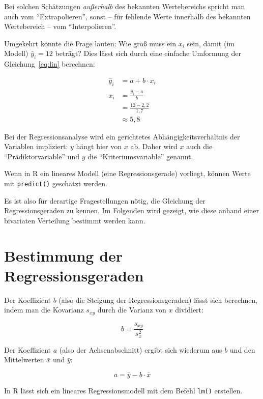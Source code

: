 \documentclass[
  11pt,
  ngerman,
  a4paper,
]{report}
\newenvironment{rtip}{
  \medskip
  \begin{tcolorbox}[colframe=purple,colback=light_gray,title=Softwarehinweis]
}{
  \end{tcolorbox}
  \medskip
}
\begin{document}
Bei solchen Schätzungen \emph{außerhalb} des bekannten Wertebereichs spricht man auch vom \enquote{Extrapolieren}, sonst -- für fehlende Werte innerhalb des bekannten Wertebereich -- vom \enquote{Interpolieren}.

Umgekehrt könnte die Frage lauten: Wie groß muss ein \(x_i\) sein, damit (im Modell) \(\hat{y}_i=12\) beträgt? Dies lässt sich durch eine einfache Umformung der Gleichung~\eqref{eq:lin} berechnen:

\[
\begin{aligned}
\hat{y}_i&=a+b\cdot x_i\\[5pt]
x_i&=\frac{\hat{y}_i-a}{b}\\[5pt]
&=\frac{12-2{,}2}{1{,}7}\\
   &\approx5{,}8
\end{aligned}
\]

Bei der Regressionsanalyse wird ein gerichtetes Abhängigkeitsverhältnis der Variablen impliziert: \(y\) hängt hier von \(x\) ab. Daher wird \(x\) auch die \enquote{Prädiktorvariable} und \(y\) die \enquote{Kriteriumsvariable} genannt.

\begin{rtip}
Wenn in R ein lineares Modell (eine Regressionsgerade) vorliegt, können Werte mit \verb|predict()| geschätzt werden.
\end{rtip}

Es ist also für derartige Fragestellungen nötig, die Gleichung der Regressionsgeraden zu kennen. Im Folgenden wird gezeigt, wie diese anhand einer bivariaten Verteilung bestimmt werden kann.

\hypertarget{bestimmung-der-regressionsgeraden}{%
\section{Bestimmung der Regressionsgeraden}\label{bestimmung-der-regressionsgeraden}}

Der Koeffizient \(b\) (also die Steigung der Regressionsgeraden) lässt sich berechnen, indem man die Kovarianz \(s_{xy}\) durch die Varianz von \(x\) dividiert:

\[
b=\frac{s_{xy}}{s^2_x}
\label{eq:b}
\]

Der Koeffizient \(a\) (also der Achsenabschnitt) ergibt sich wiederum aus \(b\) und den Mittelwerten \(\bar{x}\) und \(\bar{y}\):

\nopagebreak

\[
a=\bar{y}-b\cdot\bar{x}
\label{eq:a}
\]

\begin{rtip}
In R lässt sich ein lineares Regressionsmodell mit dem Befehl \verb|lm()| erstellen.
\end{rtip}
\end{document}
